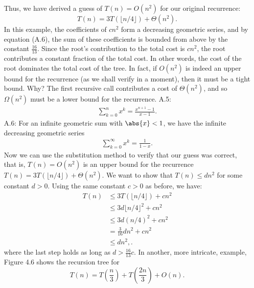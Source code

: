 \documentclass{report}
\begin{document}
        Thus, we have derived a guess of \(T(n) = O(n^2)\) for our original recurrence:
        \[
            T(n) = 3T(\lfloor n/4 \rfloor) + \Theta(n^2).
        \]
        In this example, the coefficients of \(c n^2\) form a decreasing geometric series, and by equation (A.6), the sum of these coefficients 
        is bounded from above by the constant \( \frac{16}{13} \). Since the root's contribution to the
        total cost is \( cn^2 \), the root contributes a constant fraction of the total cost. In other
        words, the cost of the root dominates the total cost of the tree.
        \bigbreak \noindent 
        In fact, if \( O(n^2) \) is indeed an upper bound for the recurrence (as we shall verify in
        a moment), then it must be a tight bound. Why? The first recursive call contributes
        a cost of \( \Theta(n^2) \), and so \( \Omega(n^2) \) must be a lower bound for the recurrence.
        \bigbreak \noindent 
        A.5:
        \begin{align*}
            \sum_{k=0}^{n}x^{k} = \frac{x^{n+1} - 1}{x-1}
        .\end{align*}
        A.6: For an infinite geometric sum with $\abs{x} < 1 $, we have the infinite decreasing geometric series
        \begin{align*}
            \sum_{k=0}^{\infty} x^{k} = \frac{1}{1-x}            
        .\end{align*}
        \bigbreak \noindent 
        Now we can use the substitution method to verify that our guess was correct, 
        that is, \( T(n) = O(n^2) \) is an upper bound for the recurrence \( T(n) = 3T(\lfloor n/4 \rfloor) + \Theta(n^2) \).
        We want to show that \( T(n) \leq d n^2 \) for some constant \( d > 0 \). Using the same constant \( c > 0 \) as before, we have:
        \begin{align*}
            T(n) &\leq 3T(\lfloor n/4 \rfloor) + c n^2 \\
            &\leq 3d \lfloor n/4 \rfloor^2 + c n^2 \\
            &\leq 3d(n/4)^2 + c n^2 \\
            &= \frac{3}{16} d n^2 + c n^2 \\
            &\leq d n^2,
        .\end{align*}
        where the last step holds as long as \( d > \frac{16}{13} c \).
        \bigbreak \noindent 
        In another, more intricate, example, Figure 4.6 shows the recursion tree for
        \[
            T(n) = T\left(\frac{n}{3}\right) + T\left(\frac{2n}{3}\right) + O(n).
        \]
\end{document}
